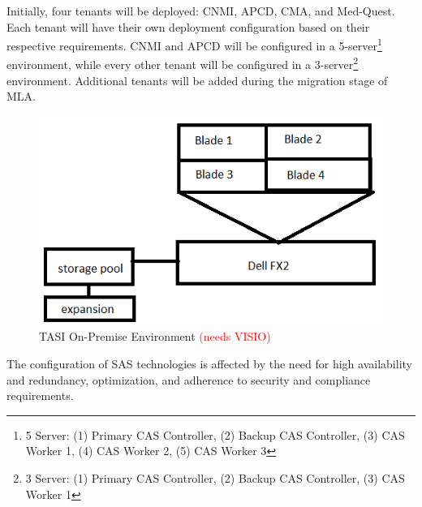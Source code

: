 Initially, four tenants will be deployed: CNMI, APCD, CMA, and Med-Quest. Each tenant will have their own deployment configuration based on their respective requirements. CNMI and APCD will be configured in a 5-server\footnote{5 Server: (1) Primary CAS Controller, (2) Backup CAS Controller, (3) CAS Worker 1, (4) CAS Worker 2, (5) CAS Worker 3} environment, while every other tenant will be configured in a 3-server\footnote{3 Server: (1) Primary CAS Controller, (2) Backup CAS Controller, (3) CAS Worker 1} environment. Additional tenants will be added during the migration stage of MLA.

\begin{figure}[H]
    \centering
    \includegraphics[scale = 0.75]{images/currentENV.png}
    \caption{TASI On-Premise Environment \textcolor{red}{(needs VISIO)} }
    \label{Current ENV}
\end{figure}

The configuration of SAS technologies is affected by the need for high availability and redundancy, optimization, and adherence to security and compliance requirements.

